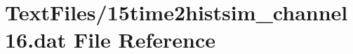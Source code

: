 \hypertarget{15time2histsim__channel16_8dat}{}\section{Text\+Files/15time2histsim\+\_\+channel16.dat File Reference}
\label{15time2histsim__channel16_8dat}
